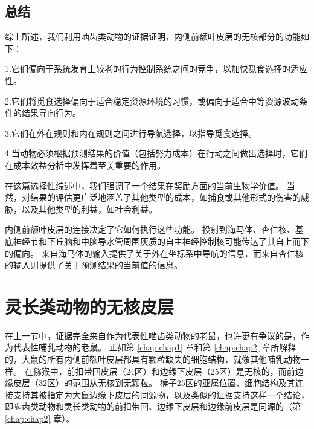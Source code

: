 \subsection{总结}

综上所述，我们利用啮齿类动物的证据证明，内侧前额叶皮层的无核部分的功能如下：\par


1.它们偏向于系统发育上较老的行为控制系统之间的竞争，以加快觅食选择的适应性。\par


2.它们将觅食选择偏向于适合稳定资源环境的习惯，或偏向于适合中等资源波动条件的结果导向行为。\par


3.它们在外在规则和内在规则之间进行导航选择，以指导觅食选择。\par


4.当动物必须根据预测结果的价值（包括努力成本）在行动之间做出选择时，它们在成本效益分析中发挥着至关重要的作用。\par


在这篇选择性综述中，我们强调了一个结果在奖励方面的当前生物学价值。
当然，对结果的评估更广泛地涵盖了其他类型的成本，如捕食或其他形式的伤害的威胁，以及其他类型的利益，如社会利益。\par


内侧前额叶皮层的连接决定了它如何执行这些功能。
投射到海马体、杏仁核、基底神经节和下丘脑和中脑导水管周围灰质的自主神经控制核可能传达了其自上而下的偏向。
来自海马体的输入提供了关于外在坐标系中导航的信息，而来自杏仁核的输入则提供了关于预测结果的当前值的信息。\par



\section{灵长类动物的无核皮层}

在上一节中，证据完全来自作为代表性啮齿类动物的老鼠，也许更有争议的是，作为代表性哺乳动物的老鼠。
正如第 \ref{chap:chap1} 章和第 \ref{chap:chap2} 章所解释的，大鼠的所有内侧前额叶皮层都具有颗粒缺失的细胞结构，就像其他哺乳动物一样。
在猕猴中，前扣带回皮层（24区）和边缘下皮层（25区）是无核的，而前边缘皮层（32区）的范围从无核到无颗粒\cite{Vogt&Derbyshire,2009;Mackey&Petrides,2010}。
猴子25区的亚属位置、细胞结构及其连接\cite{freedman2000subcortical}支持其被指定为大鼠边缘下皮层的同源物，以及类似的证据支持这样一个结论，即啮齿类动物和灵长类动物的前扣带回、边缘下皮层和边缘前皮层是同源的（第 \ref{chap:chap2} 章）。\par



